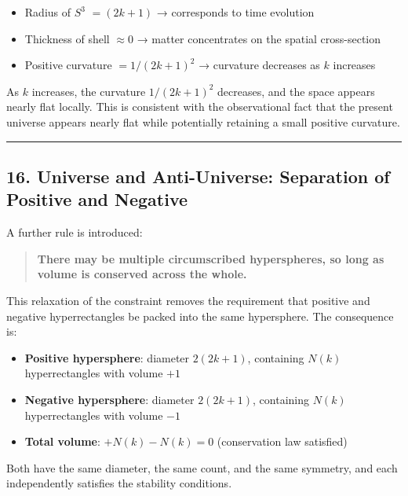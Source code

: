 \documentclass[a4paper,11pt]{article}
\theoremstyle{definition}
\providecommand{\tightlist}{\setlength{\itemsep}{0pt}\setlength{\parskip}{0pt}}
\begin{document}
\begin{itemize}
\tightlist
\item
  Radius of \(S^3\) \(= (2k+1)\) → corresponds to time evolution
\item
  Thickness of shell \(\approx 0\) → matter concentrates on the spatial
  cross-section
\item
  Positive curvature \(= 1/(2k+1)^2\) → curvature decreases as \(k\)
  increases
\end{itemize}

As \(k\) increases, the curvature \(1/(2k+1)^2\) decreases, and the
space appears nearly flat locally. This is consistent with the
observational fact that the present universe appears nearly flat while
potentially retaining a small positive curvature.

\begin{center}\rule{0.5\linewidth}{0.5pt}\end{center}

\subsection{16. Universe and Anti-Universe: Separation of Positive and
Negative}\label{universe-and-anti-universe-separation-of-positive-and-negative}

A further rule is introduced:

\begin{quote}
\textbf{There may be multiple circumscribed hyperspheres, so long as
volume is conserved across the whole.}
\end{quote}

This relaxation of the constraint removes the requirement that positive
and negative hyperrectangles be packed into the same hypersphere. The
consequence is:

\begin{itemize}
\tightlist
\item
  \textbf{Positive hypersphere}: diameter \(2(2k+1)\), containing
  \(N(k)\) hyperrectangles with volume \(+1\)
\item
  \textbf{Negative hypersphere}: diameter \(2(2k+1)\), containing
  \(N(k)\) hyperrectangles with volume \(-1\)
\item
  \textbf{Total volume}: \(+N(k) - N(k) = 0\) (conservation law
  satisfied)
\end{itemize}

Both have the same diameter, the same count, and the same symmetry, and
each independently satisfies the stability conditions.
\end{document}
